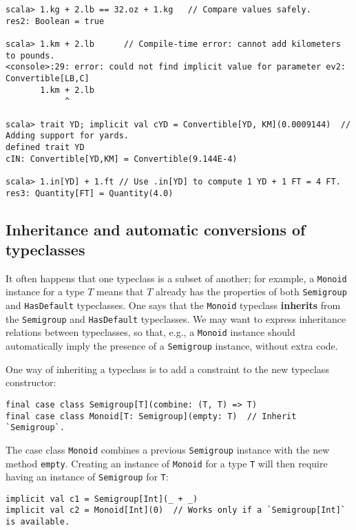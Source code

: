 \begin{lstlisting}[frame=single,fillcolor={\color{black}},framesep={0.2mm},framexleftmargin=2mm,framexrightmargin=2mm,framextopmargin=2mm,framexbottommargin=2mm]
scala> 1.kg + 2.lb == 32.oz + 1.kg   // Compare values safely.
res2: Boolean = true

scala> 1.km + 2.lb      // Compile-time error: cannot add kilometers to pounds.
<console>:29: error: could not find implicit value for parameter ev2: Convertible[LB,C]
       1.km + 2.lb
            ^

scala> trait YD; implicit val cYD = Convertible[YD, KM](0.0009144)  // Adding support for yards.
defined trait YD
cIN: Convertible[YD,KM] = Convertible(9.144E-4)

scala> 1.in[YD] + 1.ft // Use .in[YD] to compute 1 YD + 1 FT = 4 FT.
res3: Quantity[FT] = Quantity(4.0)
\end{lstlisting}


\subsection{Inheritance and automatic conversions of typeclasses\label{subsec:Inheritance-and-automatic-typeclass}}

It often happens that one typeclass is a subset of another; for example,
a \lstinline!Monoid! instance for a type $T$ means that $T$ already
has the properties of both \lstinline!Semigroup! and \lstinline!HasDefault!
typeclasses. One says that the \lstinline!Monoid! typeclass \textbf{inherits}
from the \lstinline!Semigroup! and \lstinline!HasDefault! typeclasses.
We may want to express inheritance relations between typeclasses,
so that, e.g., a \lstinline!Monoid! instance should automatically
imply the presence of a \lstinline!Semigroup! instance, without extra
code.

One way of inheriting a typeclass is to add a constraint to the new
typeclass constructor:
\begin{lstlisting}
final case class Semigroup[T](combine: (T, T) => T)
final case class Monoid[T: Semigroup](empty: T)  // Inherit `Semigroup`.
\end{lstlisting}
The case class \lstinline!Monoid! combines a previous \lstinline!Semigroup!
instance with the new method \lstinline!empty!. Creating an instance
of \lstinline!Monoid! for a type \lstinline!T! will then require
having an instance of \lstinline!Semigroup! for \lstinline!T!:
\begin{lstlisting}
implicit val c1 = Semigroup[Int](_ + _)
implicit val c2 = Monoid[Int](0)  // Works only if a `Semigroup[Int]` is available.
\end{lstlisting}

